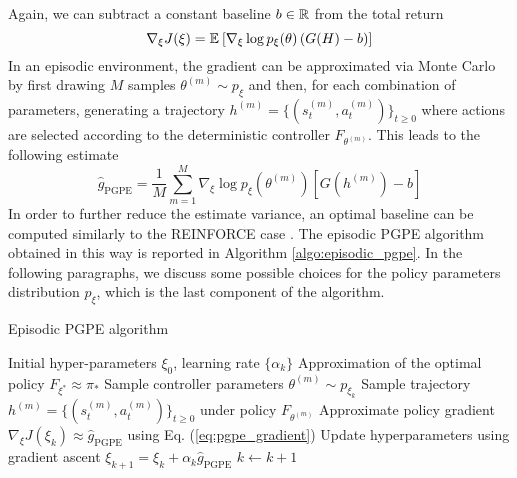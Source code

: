 Again, we can subtract a constant baseline $b \in \mathbb{R}$ from the total return 
\begin{equation}
	\nabla_\xi J(\xi) = \mathbb{E}_{}\left[ \nabla_\xi \log p_\xi(\theta)\left(G(H) - b\right) \right]
\end{equation}
In an episodic environment, the gradient can be approximated via Monte Carlo by first drawing $M$ samples $\theta^{(m)} \sim p_\xi$ and then, for each combination of parameters, generating a trajectory $h^{(m)} = \{(s_t^{(m)}, a_t^{(m)})\}_{t \geq 0}$ where actions are selected according to the deterministic controller $F_{\theta^{(m)}}$. This leads to the following estimate
\begin{equation}
\label{eq:pgpe_gradient}
	\widehat{g}_{\text{PGPE}} = \frac{1}{M} \sum^{M}_{m=1} \nabla_\xi \log p_\xi\left(\theta^{(m)}\right) \left[G\left(h^{(m)}\right)-b\right] 
\end{equation}
In order to further reduce the estimate variance, an optimal baseline can be computed similarly to the REINFORCE case \cite{zhao2011analysis}. The episodic \gls{PGPE} algorithm obtained in this way is reported in Algorithm \ref{algo:episodic_pgpe}. In the following paragraphs, we discuss some possible choices for the policy parameters distribution $p_\xi$, which is the last component of the algorithm. 

\begin{algorithm}[t]
	\caption{Episodic PGPE algorithm}
	\label{algo:episodic_pgpe}
	\begin{algorithmic}[1]
		\Require Initial hyper-parameters $\xi_0$, learning rate $\{\alpha_k\}$
		\Ensure Approximation of the optimal policy $F_{\xi^*} \approx \pi_*$
		\Repeat
				\State Sample controller parameters $\theta^{(m)} \sim p_{\xi_k}$ 
				\State Sample trajectory $h^{(m)} = \{(s_t^{(m)}, a_t^{(m)})\}_{t \geq 0}$ under policy $F_{\theta^{(m)}}$
			\EndFor
			\State Approximate policy gradient $\nabla_\xi J(\xi_k) \approx \widehat{g}_\text{PGPE}$ using Eq. (\ref{eq:pgpe_gradient})
			\State Update hyperparameters using gradient ascent $\xi_{k+1} = \xi_k + \alpha_k \widehat{g}_\text{PGPE}$
			\State $k \leftarrow k + 1$
	\end{algorithmic}
\end{algorithm}

